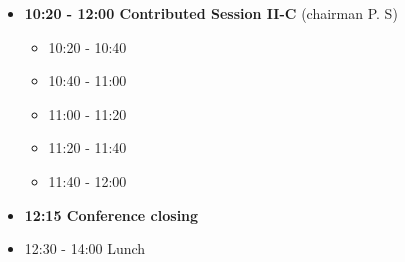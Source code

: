 \documentclass[10pt, A4]{article}%
\begin{document}
\begin{itemize}
\begin{itemize}
  \end{itemize}
    \item {\bf 10:20 - 12:00 Contributed Session II-C} (chairman P. S) 
  \begin{itemize}
    \item 10:20 - 10:40 
    \item 10:40 - 11:00 
    \item 11:00 - 11:20 
    \item 11:20 - 11:40 
    \item 11:40 - 12:00 
  \end{itemize}
  \item {\bf 12:15 Conference closing}
  \item 12:30 - 14:00 Lunch
\end{itemize}
\end{document}
